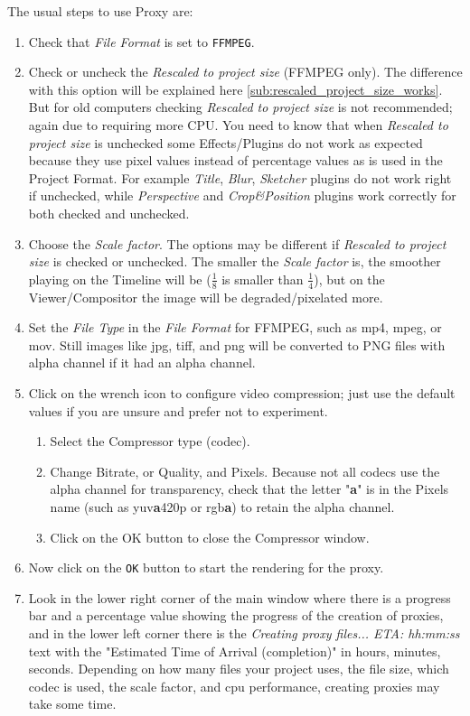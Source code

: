 The usual steps to use Proxy are:
\begin{enumerate}
	\item Check that \textit{File Format} is set to \texttt{FFMPEG}.
	\item Check or uncheck the \textit{Rescaled to project size} (FFMPEG only). The difference with this option will be explained here \ref{sub:rescaled_project_size_works}. But for old computers checking \textit{Rescaled to project size} is not recommended; again due to requiring more CPU. You need to know that when \textit{Rescaled to project size} is unchecked some Effects/Plugins do not work as expected because they use pixel values instead of percentage values as is used in the Project Format. For example \textit{Title}, \textit{Blur}, \textit{Sketcher} plugins do not work right if unchecked, while \textit{Perspective} and \textit{Crop\&Position} plugins work correctly for both checked and unchecked.
	\item Choose the \textit{Scale factor}. The options may be different if \textit{Rescaled to project size} is checked or unchecked. The smaller the \textit{Scale factor} is, the smoother playing on the Timeline will be ($\frac{1}{8}$ is smaller than $\frac{1}{4}$), but on the Viewer/Compositor the image will be degraded/pixelated more.
	\item Set the \textit{File Type} in the \textit{File Format} for FFMPEG, such as mp4, mpeg, or mov. Still images like jpg, tiff, and png will be converted to PNG files with alpha channel if it had an alpha channel.
	\item Click on the wrench icon to configure video compression; just use the default values if you are unsure and prefer not to experiment.
	\begin{enumerate}
		\item Select the Compressor type (codec).
		\item Change Bitrate, or Quality, and Pixels. Because not all codecs use the alpha channel for transparency, check that the letter "\textbf{a}" is in the Pixels name (such as yuv\textbf{a}420p or rgb\textbf{a}) to retain the alpha channel.
		\item Click on the OK button to close the Compressor window.
	\end{enumerate}
	\item Now click on the \texttt{OK} button to start the rendering for the proxy.
	\item Look in the lower right corner of the main window where there is a progress bar and a percentage value showing the progress of the creation of proxies, and in the lower left corner there is the \textit{Creating proxy files... ETA: hh:mm:ss} text with the "Estimated Time of Arrival (completion)" in hours, minutes, seconds. Depending on how many files your project uses, the file size, which codec is used, the scale factor, and cpu performance, creating proxies may take some time.
\end{enumerate}

